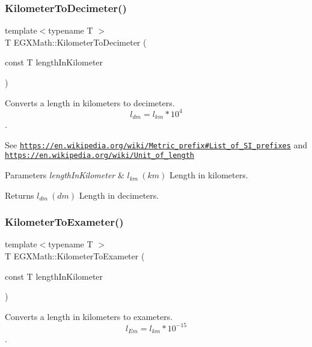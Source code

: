 \subsubsection{\texorpdfstring{Kilometer\+To\+Decimeter()}{KilometerToDecimeter()}}
{\footnotesize\ttfamily template$<$typename T $>$ \\
T E\+G\+X\+Math\+::\+Kilometer\+To\+Decimeter (\begin{DoxyParamCaption}\item[{const T}]{length\+In\+Kilometer }\end{DoxyParamCaption})}



Converts a length in kilometers to decimeters. \[ l_{dm}=l_{km} * 10^{4} \]. 

See \href{https://en.wikipedia.org/wiki/Metric_prefix#List_of_SI_prefixes}{\tt https\+://en.\+wikipedia.\+org/wiki/\+Metric\+\_\+prefix\#\+List\+\_\+of\+\_\+\+S\+I\+\_\+prefixes} and \href{https://en.wikipedia.org/wiki/Unit_of_length}{\tt https\+://en.\+wikipedia.\+org/wiki/\+Unit\+\_\+of\+\_\+length} 
\begin{DoxyParams}{Parameters}
{\em length\+In\+Kilometer} & $ l_{km}\ (km)$ Length in kilometers. \\
\hline
\end{DoxyParams}
\begin{DoxyReturn}{Returns}
$ l_{dm}\ (dm)$ Length in decimeters. 
\end{DoxyReturn}
\mbox{\label{group___e_g_x_math-_conversions-_length_conversions-_s_i-_kilometer-_s_i_gae947c63c1b914d80d7ed3b35df15d02a}} 
\subsubsection{\texorpdfstring{Kilometer\+To\+Exameter()}{KilometerToExameter()}}
{\footnotesize\ttfamily template$<$typename T $>$ \\
T E\+G\+X\+Math\+::\+Kilometer\+To\+Exameter (\begin{DoxyParamCaption}\item[{const T}]{length\+In\+Kilometer }\end{DoxyParamCaption})}



Converts a length in kilometers to exameters. \[ l_{Em}=l_{km} * 10^{-15} \]. 

